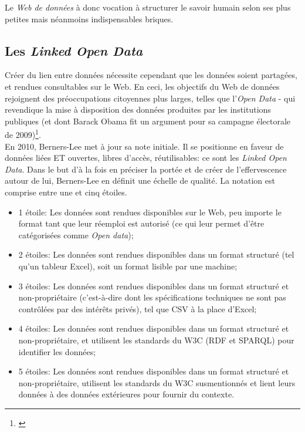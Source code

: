\documentclass[a4paper,12pt,twoside]{book}
\begin{document}
Le \textit{Web de données} à donc vocation à structurer le savoir humain selon ses plus petites mais néanmoins indispensables briques. 

\subsection{Les \textit{Linked Open Data}}
Créer du lien entre données nécessite cependant que les données soient partagées, et rendues consultables sur le Web. En ceci, les objectifs du Web de données rejoignent des préoccupations citoyennes plus larges, telles que l'\textit{Open Data} - qui revendique la mise à disposition des données produites par les institutions publiques (et dont Barack Obama fit un argument pour sa campagne électorale de 2009)\footnote{\cite[p.~57]{bermesWebSemantiqueBibliotheque2013}}.\\

En 2010, Berners-Lee met à jour sa note initiale. Il se positionne en faveur de données liées ET ouvertes, libres d'accès, réutilisables: ce sont les \textit{Linked Open Data}. Dans le but d'à la fois en préciser la portée et de créer de l'effervescence autour de lui, Berners-Lee en définit une échelle de qualité. La notation est comprise entre une et cinq étoiles. 
\begin{itemize}
    \item 1 étoile: Les données sont rendues disponibles sur le Web, peu importe le format tant que leur réemploi est autorisé (ce qui leur permet d'être catégorisées comme \textit{Open data});
    \item 2 étoiles: Les données sont rendues disponibles dans un format structuré (tel qu'un tableur Excel), soit un format lisible par une machine;
    \item 3 étoiles: Les données sont rendues disponibles dans un format structuré et non-propriétaire (c'est-à-dire dont les spécifications techniques ne sont pas contrôlées par des intérêts privés), tel que CSV à la place d'Excel;
    \item 4 étoiles: Les données sont rendues disponibles dans un format structuré et non-propriétaire, et utilisent les standards du W3C (RDF et SPARQL) pour identifier les données;
    \item 5 étoiles: Les données sont rendues disponibles dans un format structuré et non-propriétaire, utilisent les standards du W3C susmentionnés et lient leurs données à des données extérieures pour fournir du contexte.
\end{itemize}
\end{document}
